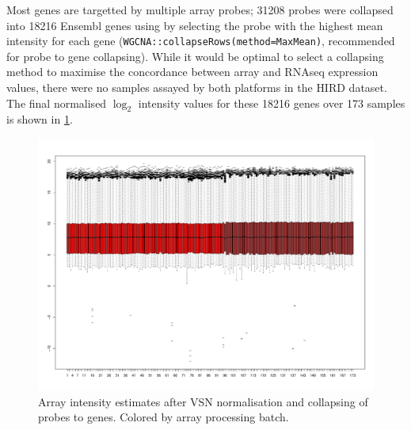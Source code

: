 Most genes are targetted by multiple array probes; 31208 probes were collapsed into 18216 Ensembl genes using by selecting the probe with the highest mean intensity for each gene (\texttt{WGCNA::collapseRows(method=MaxMean)}, recommended for probe to gene collapsing\autocite{miller2011StrategiesAggregatingGene}).
While it would be optimal to select a collapsing method to maximise the concordance between array and \gls{RNAseq} expression values, there were no samples assayed by both platforms in the \gls{HIRD} dataset.
The final normalised $\log_2$ intensity values for these 18216 genes over 173 samples is shown in \cref{fig:hird_array_boxplots_MaxMean}.

\begin{figure}
    \centering
    \includegraphics[width=1.0\textwidth]{mainmatter/figures/chapter_02/array_data_setup.array_intensity_boxplots.MaxMean.pdf}
    \caption{Array intensity estimates after VSN normalisation and collapsing of probes to genes. Colored by array processing batch.}
    \label{fig:hird_array_boxplots_MaxMean}
\end{figure}

